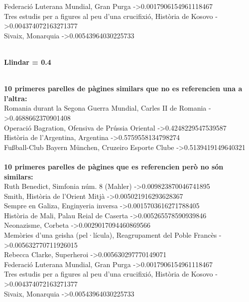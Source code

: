 \documentclass{report}
\begin{document}
Federació Luterana Mundial, Gran Purga -\textgreater 0.0017906154961118467 \\ 
Tres estudis per a figures al peu d'una crucifixió, Història de Kosovo -\textgreater 0.004374072163271377 \\ 
Sivaix, Monarquia -\textgreater 0.00543964030225733 \\ 
 \\ 
\newline
\centerline{ \textbf{Llindar = 0.4} }
\newline
 \\ 
\textbf{10 primeres parelles de pàgines similars que no es referencien una a l'altra:} \\ 
Romania durant la Segona Guerra Mundial, Carles II de Romania -\textgreater 0.4688662370901408 \\ 
Operació Bagration, Ofensiva de Prússia Oriental -\textgreater 0.4248229547539587 \\ 
Història de l'Argentina, Argentina -\textgreater 0.5759558134798274 \\ 
Fußball-Club Bayern München, Cruzeiro Esporte Clube -\textgreater 0.5139419149640321 \\ 
 \\ 
\textbf{10 primeres parelles de pàgines que es referencien però no són similars:} \\ 
Ruth Benedict, Simfonia núm. 8 (Mahler) -\textgreater 0.009823870046741895 \\ 
Smith, Història de l'Orient Mitjà -\textgreater 0.005021916293628367 \\ 
Sempre en Galiza, Enginyeria inversa -\textgreater 0.0015703616271788405 \\ 
Història de Mali, Palau Reial de Caserta -\textgreater 0.005265578590939846 \\ 
Neonazisme, Corbeta -\textgreater 0.0029017094460869566 \\ 
Memòries d'una geisha (pel·lícula), Reagrupament del Poble Francès -\textgreater 0.005632770711926015 \\ 
Rebecca Clarke, Superheroi -\textgreater 0.005630297770149071 \\ 
Federació Luterana Mundial, Gran Purga -\textgreater 0.0017906154961118467 \\ 
Tres estudis per a figures al peu d'una crucifixió, Història de Kosovo -\textgreater 0.004374072163271377 \\ 
Sivaix, Monarquia -\textgreater 0.00543964030225733 \\ 
 \\ 
\end{document}
